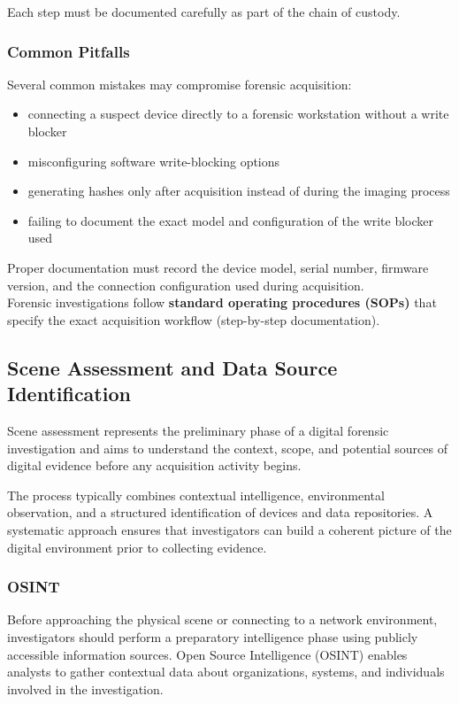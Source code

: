 \noindent
Each step must be documented carefully as part of the chain of custody.

\subsubsection*{Common Pitfalls}

Several common mistakes may compromise forensic acquisition:

\begin{itemize}
\item connecting a suspect device directly to a forensic workstation without a write blocker
\item misconfiguring software write-blocking options
\item generating hashes only after acquisition instead of during the imaging process
\item failing to document the exact model and configuration of the write blocker used
\end{itemize}

\noindent
Proper documentation must record the device model, serial number, firmware version, and the connection configuration used during acquisition.\\
Forensic investigations follow \textbf{standard operating procedures (SOPs)} that specify the exact acquisition workflow (step-by-step documentation).



\subsection{Scene Assessment and Data Source Identification}

Scene assessment represents the preliminary phase of a digital forensic investigation and aims to understand the context, scope, and potential sources of digital evidence before any acquisition activity begins.
\medskip

\noindent
The process typically combines contextual intelligence, environmental observation, and a structured identification of devices and data repositories. A systematic approach ensures that investigators can build a coherent picture of the digital environment prior to collecting evidence.

\subsubsection{OSINT}

Before approaching the physical scene or connecting to a network environment, investigators should perform a preparatory intelligence phase using publicly accessible information sources. Open Source Intelligence (OSINT) enables analysts to gather contextual data about organizations, systems, and individuals involved in the investigation.
\medskip

